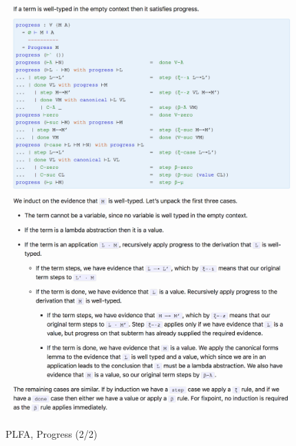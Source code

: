 \documentclass[runningheads]{llncs}
\begin{document}
\begin{figure}[p]
  \includegraphics[width=\textwidth]{figures/plfa-progress-2.png}
  \includegraphics[width=\textwidth]{figures/plfa-progress-3a.png}
  \caption{PLFA, Progress (2/2)}
  \label{fig:plfa-progress-2}
\end{figure}  
\end{document}
